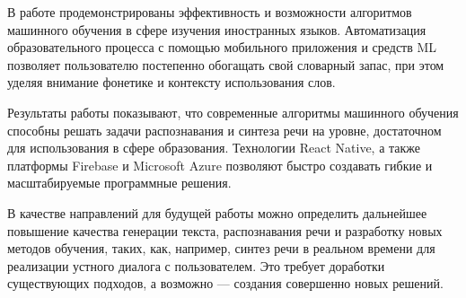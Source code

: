 В работе продемонстрированы эффективность и возможности алгоритмов машинного обучения в сфере изучения иностранных языков. Автоматизация образовательного процесса с помощью мобильного приложения и средств ML позволяет пользователю постепенно обогащать свой словарный запас, при этом уделяя внимание фонетике и контексту использования слов.

Результаты работы показывают, что современные алгоритмы машинного обучения способны решать задачи распознавания и синтеза речи на уровне, достаточном для использования в сфере образования. Технологии React Native, а также платформы Firebase и Microsoft Azure позволяют быстро создавать гибкие и масштабируемые программные решения.

В качестве направлений для будущей работы можно определить дальнейшее повышение качества генерации текста, распознавания речи и разработку новых методов обучения, таких, как, например, синтез речи в реальном времени для реализации устного диалога с пользователем. Это требует доработки существующих подходов, а возможно --- создания совершенно новых решений.
